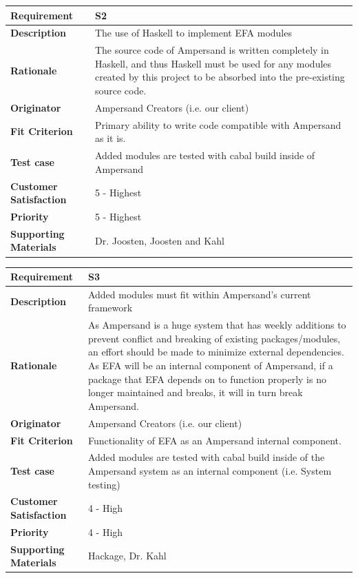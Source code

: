 \documentclass[12pt]{report}
\begin{document}
{\setlength{\tabcolsep}{12pt} %
    \begin{tabularx}{\textwidth}{>{\bfseries}m{3cm}X}
        Requirement & S2 \\ 
        \midrule
        \endhead
        Description  & The use of Haskell to implement EFA modules
        \\	Rationale & The source code of Ampersand is written completely in 
        Haskell, and thus Haskell must be used for any modules created by this 
        project to be absorbed into the pre-existing source code.
        \\	Originator & Ampersand Creators (i.e. our client)        
        \\	Fit Criterion & Primary ability to write code compatible with 
        Ampersand as it is.
        \\ Test case & Added modules are tested with cabal build inside of 
        Ampersand
        \\	Customer Satisfaction & 5 - Highest 
        \\	Priority & 5 - Highest 
        \\	Supporting Materials & Dr. Joosten, Joosten and Kahl
        \vspace{12pt}
    \end{tabularx}
}
{\setlength{\tabcolsep}{12pt} %
    \begin{tabularx}{\textwidth}{>{\bfseries}m{3cm}X}
        Requirement & S3 \\ 
        \midrule
        \endhead
        Description  & Added modules must fit within Ampersand's current 
        framework
        \\	Rationale & As Ampersand is a huge system that has weekly additions 
        to prevent conflict and breaking of existing packages/modules, an 
        effort should be made to minimize external dependencies. As EFA will be 
        an internal component of Ampersand, if a package that EFA depends on to 
        function properly is no longer maintained and breaks, it will in turn 
        break Ampersand.
        \\	Originator & Ampersand Creators (i.e. our client)        
        \\	Fit Criterion & Functionality of EFA as an Ampersand internal 
        component.
        \\ Test case & Added modules are tested with cabal build inside of the
        Ampersand system as an internal component (i.e. System testing)
        \\	Customer Satisfaction & 4 - High 
        \\	Priority & 4 - High
        \\	Supporting Materials & Hackage, Dr. Kahl
        \vspace{12pt}
    \end{tabularx}
}
\end{document}
